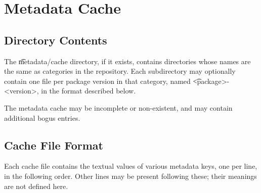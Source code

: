 \chapter{Metadata Cache}
\label{sec:metadata-cache}

\section{Directory Contents}

The \t{metadata/cache} directory, if it exists, contains directories whose names are the same as
categories in the repository. Each subdirectory may optionally contain one file per package version
in that category, named \t{<package>-<version>}, in the format described below.

The metadata cache may be incomplete or non-existent, and may contain additional bogus entries.

\section{Cache File Format}

Each cache file contains the textual values of various metadata keys, one per line, in the following
order. Other lines may be present following these; their meanings are not defined here.

